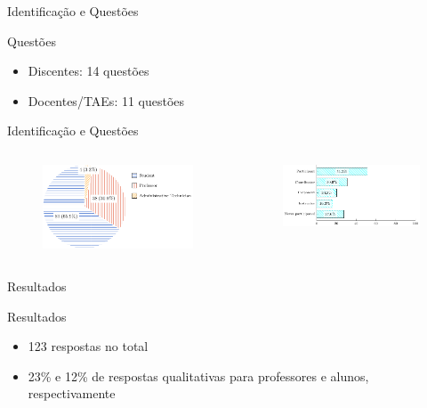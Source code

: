 \begin{frame}{{\sffamily Identificação e Questões}}
  \begin{block}{Questões}
    \begin{itemize}
      \item Discentes: 14 questões
      \item Docentes/TAEs: 11 questões
    \end{itemize}
  \end{block}
\end{frame}


\begin{frame}{{\sffamily Identificação e Questões}}

\begin{columns}
\begin{column}{0.5\textwidth}
   \begin{figure}
        \centering
        \includegraphics[width=6cm, ]{imagens/5-community-roles.pdf}
    \end{figure}
\end{column}
\begin{column}{0.5\textwidth}  %
\begin{figure}
        \centering
        \includegraphics[width=5.5cm, ]{imagens/5-outreach-roles.pdf}
    \end{figure}
\end{column}
\end{columns}
\end{frame}



\begin{frame}{{\sffamily Resultados}}
  \begin{block}{Resultados}
    \begin{itemize}
      \item 123 respostas no total
      \item 23\% e 12\% de respostas qualitativas para professores e alunos, respectivamente
    \end{itemize}
  \end{block}
\end{frame}


